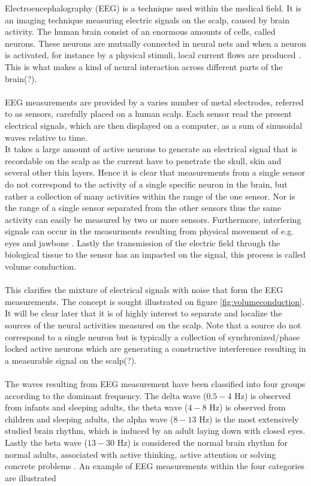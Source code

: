 Electroencephalography (EEG) is a technique used within the medical field. It is an imaging technique measuring electric signals on the scalp, caused by brain activity. 
The human brain consist of an enormous amounts of cells, called neurons. These neurons are mutually connected in neural nets and when a neuron is activated, for instance by a physical stimuli, local current flows are produced \cite{fundamentalEEG}. This is what makes a kind of neural interaction across different parts of the brain(?). 
\\
\\
EEG measurements are provided by a varies number of metal electrodes, referred to as sensors, carefully placed on a human scalp. Each sensor read the present electrical signals, which are then displayed on a computer, as a sum of sinusoidal waves relative to time.
\\
It takes a large amount of active neurons to generate an electrical signal that is recordable on the scalp as the current have to penetrate the skull, skin and several other thin layers.
Hence it is clear that measurements from a single sensor do not correspond to the activity of a single specific neuron in the brain, but rather a collection of many activities within the range of the one sensor.
Nor is the range of a single sensor separated from the other sensors thus the same activity can easily be measured by two or more sensors.
Furthermore, interfering signals can occur in the measurments resulting from physical movement of e.g. eyes and jawbone \cite{fundamentalEEG}. 
Lastly the transmission of the electric field through the biological tissue to the sensor has an impacted on the signal, this process is called volume conduction\cite[p. 68]{EEGsignalprocessing}.\\ \\
This clarifies the mixture of electrical signals with noise that form the EEG measurements. The concept is sought illustrated on figure \ref{fig:volumeconduction}. \\
It will be clear later that it is of highly interest to separate and localize the sources of the neural activities measured on the scalp. Note that a source do not correspond to a single neuron but is typically a collection of synchronized/phase locked active neurons which are generating a constructive interference resulting in a measurable signal on the scalp(?).     
\\
\\
The waves resulting from EEG measurement have been classified into four groups according to the dominant frequency. The delta wave ($0.5-4$ Hz) is observed from infants and sleeping adults, the theta wave ($4-8$ Hz) is observed from children and sleeping adults, the alpha wave ($8-13$ Hz) is the most extensively studied brain rhythm, which is induced by an adult laying down with closed eyes. Lastly the beta wave ($13-30$ Hz) is considered the normal brain rhythm for normal adults, associated with active thinking, active attention or solving concrete problems \cite[p. 11]{EEGsignalprocessing}. An example of EEG measurements within the four categories are illustrated 
